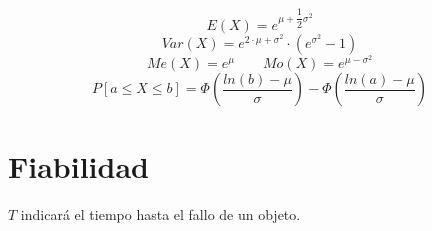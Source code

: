 \documentclass[a4paper, twocolumn, 10pt]{article}
\begin{document}
\begin{itemize}
\begin{enumerate}
\begin{equation*}
			E(X) = e^{\mu+\dfrac{1}{2}\sigma^2}
		\end{equation*}
		\begin{equation*}
			Var(X) = e^{2\cdot \mu + \sigma^2}\cdot (e^{\sigma^2}-1)
		\end{equation*}
		\begin{equation*}
			Me(X) = e^\mu \qquad Mo(X) = e^{\mu - \sigma^2}
		\end{equation*}
		\begin{equation*}
			P\left[a \leq X \leq b\right] = \Phi\left(\dfrac{ln(b)-\mu}{\sigma}\right)-\Phi\left(\dfrac{ln(a)-\mu}{\sigma}\right)
		\end{equation*}
	\end{enumerate}
\end{itemize}

\section{Fiabilidad}

$T$ indicará el tiempo hasta el fallo de un objeto.
\end{document}
